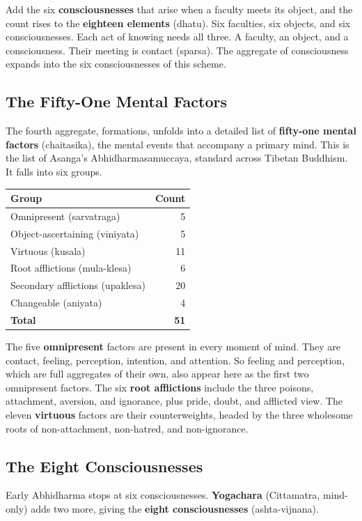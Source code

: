 Add the six \textbf{consciousnesses} that arise when a faculty meets its object, and the count rises to the \textbf{eighteen elements} (dhatu). Six faculties, six objects, and six consciousnesses. Each act of knowing needs all three. A faculty, an object, and a consciousness. Their meeting is contact (sparsa). The aggregate of consciousness expands into the six consciousnesses of this scheme.

\subsection{The Fifty-One Mental Factors}

The fourth aggregate, formations, unfolds into a detailed list of \textbf{fifty-one mental factors} (chaitasika), the mental events that accompany a primary mind. This is the list of Asanga's Abhidharmasamuccaya, standard across Tibetan Buddhism. It falls into six groups.

\begin{longtable}{@{}
L{6.2cm}r@{}}
\toprule
Group & Count \\
\midrule
Omnipresent (sarvatraga) & 5 \\
Object-ascertaining (viniyata) & 5 \\
Virtuous (kusala) & 11 \\
Root afflictions (mula-klesa) & 6 \\
Secondary afflictions (upaklesa) & 20 \\
Changeable (aniyata) & 4 \\
\textbf{Total} & \textbf{51} \\
\bottomrule
\end{longtable}

The five \textbf{omnipresent} factors are present in every moment of mind. They are contact, feeling, perception, intention, and attention. So feeling and perception, which are full aggregates of their own, also appear here as the first two omnipresent factors. The six \textbf{root afflictions} include the three poisons, attachment, aversion, and ignorance, plus pride, doubt, and afflicted view. The eleven \textbf{virtuous} factors are their counterweights, headed by the three wholesome roots of non-attachment, non-hatred, and non-ignorance.

\subsection{The Eight Consciousnesses}

Early Abhidharma stops at six consciousnesses. \textbf{Yogachara} (Cittamatra, mind-only) adds two more, giving the \textbf{eight consciousnesses} (ashta-vijnana).

